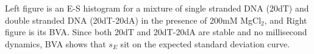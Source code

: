 \label{fig:bva_static} Left figure is an E-S histogram for a mixture of single stranded DNA (20dT) and double stranded DNA (20dT-20dA) in the presence of 200mM MgCl$_2$, and Right figure is its BVA. Since both 20dT and 20dT-20dA are stable and no millisecond dynamics, BVA shows that $s_E$ sit on the expected standard deviation curve.